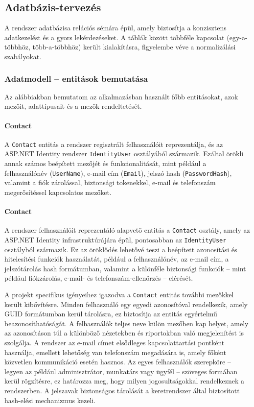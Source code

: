 \subsection{Adatbázis-tervezés}

\indent A rendszer adatbázisa relációs sémára épül, amely biztosítja a konzisztens adatkezelést és a gyors lekérdezéseket. A táblák között többféle kapcsolat (egy-a-többhöz, több-a-többhöz) került kialakításra, figyelembe véve a normalizálási szabályokat.
\newpage
\subsubsection{Adatmodell – entitások bemutatása}

Az alábbiakban bemutatom az alkalmazásban használt főbb entitásokat, azok mezőit, adattípusait és a mezők rendeltetését.

\paragraph{Contact}

A \texttt{Contact} entitás a rendszer regisztrált felhasználóit reprezentálja, és az ASP.NET Identity rendszer \texttt{IdentityUser} osztályából származik. Ezáltal örökli annak számos beépített mezőjét és funkcionalitását, mint például a felhasználónév (\texttt{UserName}), e-mail cím (\texttt{Email}), jelszó hash (\texttt{PasswordHash}), valamint a fiók zárolással, biztonsági tokenekkel, e-mail és telefonszám megerősítéssel kapcsolatos mezőket.

\paragraph{Contact}

A rendszer felhasználóit reprezentáló alapvető entitás a \texttt{Contact} osztály, amely az ASP.NET Identity infrastruktúrájára épül, pontosabban az \texttt{IdentityUser} osztályból származik. Ez az öröklődés lehetővé teszi a beépített azonosítási és hitelesítési funkciók használatát, például a felhasználónév, az e-mail cím, a jelszótárolás hash formátumban, valamint a különféle biztonsági funkciók – mint például fiókzárolás, e-mail- és telefonszám-ellenőrzés – elérését.

A projekt specifikus igényeihez igazodva a \texttt{Contact} entitás további mezőkkel került kibővítésre. Minden felhasználó egy egyedi azonosítóval rendelkezik, amely GUID formátumban kerül tárolásra, ez biztosítja az entitás egyértelmű beazonosíthatóságát. A felhasználók teljes neve külön mezőben kap helyet, amely az azonosításon túl a különböző nézetekben és riportokban való megjelenítést is szolgálja. A rendszer az e-mail címet elsődleges kapcsolattartási pontként használja, emellett lehetőség van telefonszám megadására is, amely főként közvetlen kommunikáció esetén hasznos. Az egyes felhasználók szerepköre – legyen az például adminisztrátor, munkatárs vagy ügyfél – szöveges formában kerül rögzítésre, ez határozza meg, hogy milyen jogosultságokkal rendelkeznek a rendszerben. A jelszavak biztonságos tárolását a keretrendszer által biztosított hash-elési mechanizmus kezeli.


